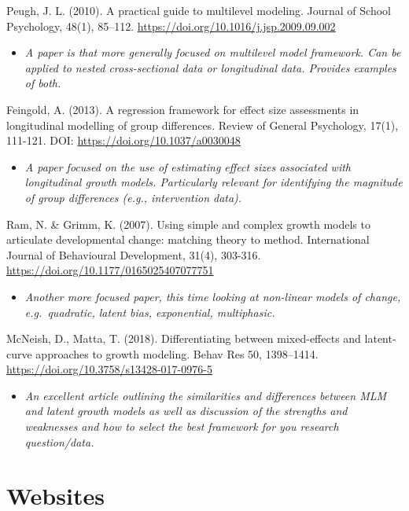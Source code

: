 \documentclass[
]{book}
\providecommand{\tightlist}{%
  \setlength{\itemsep}{0pt}\setlength{\parskip}{0pt}}
\begin{document}
Peugh, J. L. (2010). A practical guide to multilevel modeling. Journal of School Psychology, 48(1), 85--112. \url{https://doi.org/10.1016/j.jsp.2009.09.002}

\begin{itemize}
\tightlist
\item
  \emph{A paper is that more generally focused on multilevel model framework. Can be applied to nested cross-sectional data or longitudinal data. Provides examples of both. }
\end{itemize}

Feingold, A. (2013). A regression framework for effect size assessments in longitudinal modelling of group differences. Review of General Psychology, 17(1), 111-121. DOI: \url{https://doi.org/10.1037/a0030048}

\begin{itemize}
\tightlist
\item
  \emph{A paper focused on the use of estimating effect sizes associated with longitudinal growth models. Particularly relevant for identifying the magnitude of group differences (e.g., intervention data).}
\end{itemize}

Ram, N. \& Grimm, K. (2007). Using simple and complex growth models to articulate developmental change: matching theory to method. International Journal of Behavioural Development, 31(4), 303-316. \url{https://doi.org/10.1177/0165025407077751}

\begin{itemize}
\tightlist
\item
  \emph{Another more focused paper, this time looking at non-linear models of change, e.g.~quadratic, latent bias, exponential, multiphasic. }
\end{itemize}

McNeish, D., Matta, T. (2018). Differentiating between mixed-effects and latent-curve approaches to growth modeling. Behav Res 50, 1398--1414. \url{https://doi.org/10.3758/s13428-017-0976-5}

\begin{itemize}
\tightlist
\item
  \emph{An excellent article outlining the similarities and differences between MLM and latent growth models as well as discussion of the strengths and weaknesses and how to select the best framework for you research question/data. }
\end{itemize}

\section{Websites}\label{websites-2}
\end{document}
